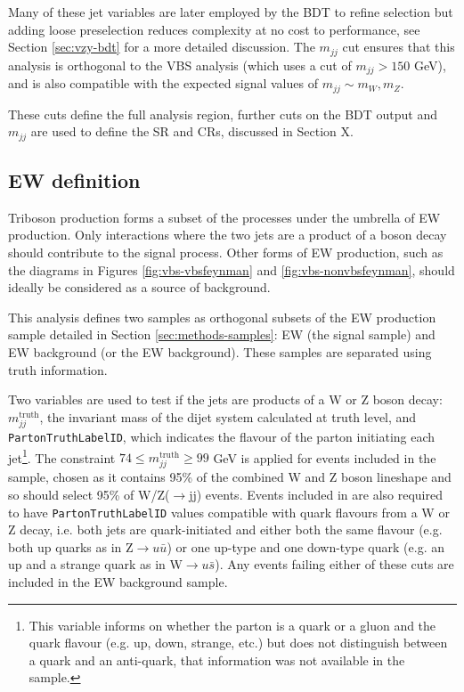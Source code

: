 Many of these jet variables are later employed by the \ac{BDT} to refine
selection but adding loose preselection reduces complexity at no cost to
performance, see Section \ref{sec:vzy-bdt} for a more detailed discussion.
The $m_{jj}$ cut ensures that this analysis is orthogonal to the \ac{VBS} \Zy
analysis (which uses a cut of $m_{jj} > 150$ GeV), and is also compatible with
the expected signal values of $m_{jj} \sim m_W,m_Z$.

These cuts define the full analysis region, further cuts on the \ac{BDT} output
and $m_{jj}$ are used to define the \ac{SR} and \acp{CR}, discussed in Section
X.  %


\subsection{\acs{EW} \VZy definition}
\label{sec:vzy-selection-vzy}

Triboson \VZy production forms a subset of the processes under the umbrella of
\ac{EW} \Zyjj production. Only interactions where the two jets are a product of
a boson decay should contribute to the signal process. Other forms of \ac{EW}
\Zyjj production, such as the diagrams in Figures \ref{fig:vbs-vbsfeynman} and
\ref{fig:vbs-nonvbsfeynman}, should ideally be considered as a source of
background.

\newcommand\mjjtruth{\ensuremath{m_{jj}^\text{truth}}\xspace}
\newcommand\partonid{\texttt{PartonTruthLabelID}\xspace}
This analysis defines two samples as orthogonal subsets of the \ac{EW} \Zyjj
production sample detailed in Section \ref{sec:methods-samples}: \ac{EW} \VZy
(the signal sample) and \ac{EW} \Zyjj background (or the \ac{EW}
background). These samples are separated using truth information.

Two variables are used to test if the jets are products of a W or Z boson decay:
\mjjtruth, the invariant mass of the dijet system calculated at truth level, and
\partonid, which indicates the flavour of the parton initiating each
jet\footnote{
  This variable informs on whether the parton is a quark or a gluon and the
  quark flavour (e.g. up, down, strange, etc.) but does not distinguish between
  a quark and an anti-quark, that information was not available in the sample.
}.
The constraint $74 \leq \mjjtruth \geq 99$ GeV is applied for events included in
the \VZy sample, chosen as it contains 95\% of the combined W and Z boson
lineshape and so should select 95\% of W/Z($\to$jj) events. Events included in
\VZy are also required to have {\partonid} values compatible with quark flavours
from a W or Z decay, i.e. both jets are quark-initiated and either both the same
flavour (e.g. both up quarks as in Z$\to u\bar{u}$) or one up-type and one
down-type quark (e.g. an up and a strange quark as in W$\to u\bar{s}$). Any
events failing either of these cuts are included in the \ac{EW} background
sample.

